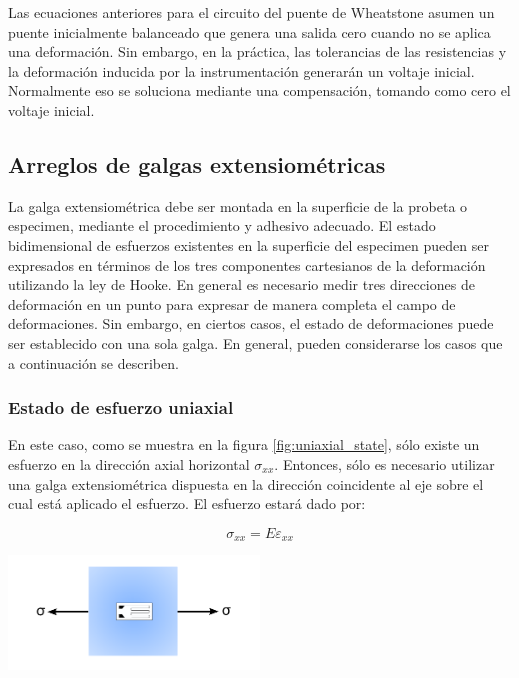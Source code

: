 Las ecuaciones anteriores para el circuito del puente de Wheatstone asumen un 
puente inicialmente balanceado que genera una salida cero cuando no se aplica una 
deformación. Sin embargo, en la práctica, las tolerancias de las resistencias y 
la deformación inducida por la instrumentación generarán un voltaje inicial. 
Normalmente eso se soluciona mediante una compensación, tomando como cero el 
voltaje inicial.

\subsection{Arreglos de galgas extensiométricas}

La galga extensiométrica debe ser montada en la superficie de la probeta o 
especimen, mediante el procedimiento y adhesivo adecuado. El estado bidimensional 
de esfuerzos existentes en la superficie del especimen pueden ser expresados en 
términos de los tres componentes cartesianos de la deformación utilizando la 
ley de Hooke. En general es necesario medir tres direcciones de deformación 
en un punto para expresar de manera completa el campo de deformaciones. Sin 
embargo, en ciertos casos, el estado de deformaciones puede ser establecido 
con una sola galga. En general, pueden considerarse los casos que a continuación 
se describen.

\subsubsection*{Estado de esfuerzo uniaxial}

En este caso, como se muestra en la figura \ref{fig:uniaxial_state}, sólo existe un 
esfuerzo en la dirección axial horizontal $\sigma_{xx}$. Entonces, sólo es necesario 
utilizar una galga extensiométrica dispuesta en la dirección coincidente al eje 
sobre el cual está aplicado el esfuerzo. El esfuerzo estará dado por:

\begin{equation}
\sigma_{xx} = E \varepsilon_{xx}
\end{equation}

\begin{center}
\includegraphics[width=0.5\textwidth]{src/ch2/uniaxial_state.pdf}
\label{fig:uniaxial_state}
\end{center}

